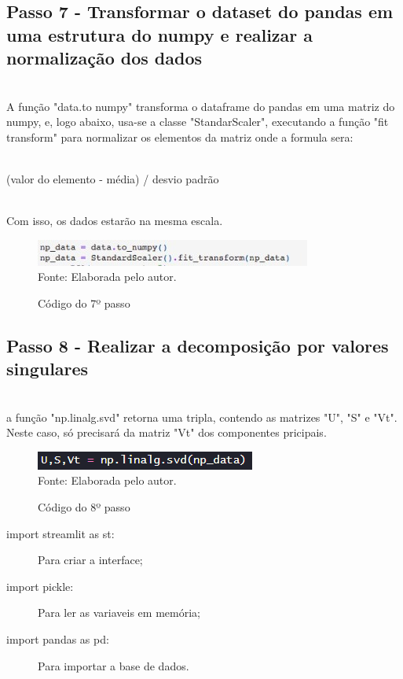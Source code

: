 \documentclass[a4paper, 12pt]{article}
\begin{document}
\subsection{Passo 7 - Transformar o dataset do pandas em uma estrutura do numpy e realizar a normalização dos dados}

\\A função "data.to numpy" transforma o dataframe do pandas em uma matriz do numpy, e, logo abaixo,
usa-se a classe "StandarScaler", executando a função "fit transform" para normalizar os elementos da
matriz onde a formula sera:

\\(valor do elemento - média) / desvio padrão

\\Com isso, os dados estarão na mesma escala.

 \begin{figure}[!ht]
        \centering
        \caption{Código do 7º passo}
        \includegraphics[scale=0.5]{passo7.jpg} \\
        {\footnotesize Fonte: Elaborada pelo autor.}
        \label{fig:my_label}
    \end{figure}

\subsection{Passo 8 - Realizar a decomposição por valores singulares}

\\a função "np.linalg.svd" retorna uma tripla, contendo as matrizes "U", "S" e "Vt". Neste caso, só
precisará da matriz "Vt" dos componentes pricipais.

 \begin{figure}[!ht]
        \centering
        \caption{Código do 8º passo}
        \includegraphics[scale=0.5]{passo8.png} \\
        {\footnotesize Fonte: Elaborada pelo autor.}
        \label{fig:my_label}
    \end{figure}

\begin{itemize}
  \begin{description}
    \item[import streamlit as st:] Para criar a interface;
    \item[import pickle:] Para ler as variaveis em memória;
    \item[import pandas as pd:] Para importar a base de dados.
  \end{description}
\end{itemize}
\end{document}
